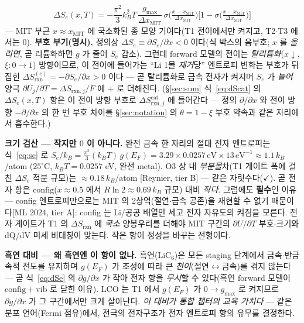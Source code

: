 \documentclass[11pt,a4paper]{article}
\newcommand{\rxn}{\mathrm{rxn}}
\newcommand{\cat}{\mathrm{cat}}
\newcommand{\config}{\mathrm{config}}
\newcommand{\vib}{\mathrm{vib}}
\newcommand{\MIT}{\mathrm{MIT}}
\begin{document}
\begin{equation}
\boxed{\;\Delta S_e(x,T)=-\frac{\pi^2}{3}k_B^2T\,\frac{g_{\max}}{\Delta x_\MIT}\,
\sigma\!\Big(\tfrac{x-x_\MIT}{\Delta x_\MIT}\Big)\Big[1-\sigma\!\Big(\tfrac{x-x_\MIT}{\Delta x_\MIT}\Big)\Big]\;}
\label{eq:dSegate}
\end{equation}
— MIT 부근 $x\approx x_\MIT$ 에 국소화된 종 모양 기여다(T1 전이에서만 켜지고, T2$\cdot$T3 에서는 $0$). \textbf{부호 부기(명시).}
정의상 $\Delta S_e\equiv\partial S_e/\partial x<0$ 이다(식 박스의 음부호; $x$ 를 \emph{올리면}, 곧 리튬화하면 $g$ 가
줄어 $S_e$ 감소). 그런데 forward 모델의 전이는 \emph{탈리튬화}($x\downarrow$, $\xi:0\to1$) 방향이므로, 이 전이에
들어가는 ``Li 1몰 \emph{제거}당'' 엔트로피 변화는 부호가 뒤집힌 $\Delta S_{\rxn}^{(e)}=-\partial S_e/\partial x>0$ 이다 —
곧 탈리튬화로 금속 전자가 켜지며 $S_e$ 가 \emph{늘어} 양극 $\partial U_j/\partial T=\Delta S_{\rxn,j}/F$ 에 $+$ 로 더해진다.
(\S\ref{sec:sum} 식~\eqref{eq:dScat} 의 $\Delta S_e(x,T)$ 항은 이 전이 방향 부호로 $\Delta S_{\rxn,j}^\cat$ 에 들어간다 —
정의 $\partial/\partial x$ 와 전이 방향 $-\partial/\partial x$ 의 한 번 부호 차이를 \S\ref{sec:notation} 의 $\theta\!=\!1-\xi$
부호 약속과 같은 자리에서 흡수한다.)

\textbf{크기 검산 — 작지만 $0$ 이 아니다.} 완전 금속 한 자리의 절대 전자 엔트로피는 식~\eqref{eq:se} 로
$S_e/k_B=\frac{\pi^2}{3}(k_BT)\,g(E_F)=3.29\times0.0257\,\text{eV}\times13\,\text{eV}^{-1}\approx1.1\,k_B$/atom
($25^\circ$C, $k_BT=0.0257$ eV, 완전 metal). O3 상 내 \emph{부분몰}차(T1 게이트 폭에 걸친 $\Delta S_e$ 적분 규모)는 $\approx0.18\,k_B$/atom
[Reynier, tier B] — 같은 자릿수다($\checkmark$). 곧 전자 항은 $\config$($x\approx0.5$ 에서 $R\ln2\approx0.69\,k_B$
규모) 대비 \emph{작다}. 그럼에도 \textbf{필수}인 이유 — config 엔트로피만으로는 MIT 의 2상역(절연$\cdot$금속 공존)을 재현할
수 없기 때문이다[ML 2024, tier A]: config 는 Li/공공 배열만 세고 전자 자유도의 켜짐을 모른다. 전자 게이트가 T1 의
$\Delta S_{\rxn}$ 에 \emph{국소} 양봉우리를 더해야 MIT 구간의 $\partial U/\partial T$ 부호$\cdot$크기와 dQ/dV 미세 비대칭이
맞는다. 작은 항이 정성을 바꾸는 전형이다.

\textbf{흑연 대비 — 왜 흑연엔 이 항이 없나.} 흑연(LiC$_6$)은 모든 staging 단계에서 금속$\cdot$반금속적 전도를 유지하며
$g(E_F)$ 가 조성에 따라 큰 \emph{천이}(절연$\leftrightarrow$금속)를 겪지 않는다 — 곧 식~\eqref{eq:dSe} 의
$\partial g/\partial x$ 가 작아 전자 항을 \emph{무시}할 수 있다(흑연 forward 모델이 $\config+\vib$ 로 닫힌 이유). LCO 는
T1 에서 $g(E_F)$ 가 $0\!\to\!g_{\max}$ 로 켜지므로 $\partial g/\partial x$ 가 그 구간에서만 크게 살아난다. \emph{이 대비가
통합 챕터의 교육 가치다} — 같은 분포 언어(Fermi 점유)에서, 전극의 전자구조가 전자 엔트로피 항의 유무를 결정한다.
\end{document}
